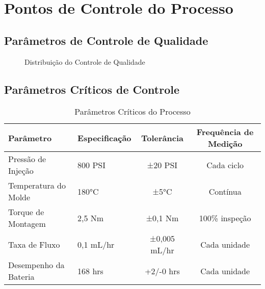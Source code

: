 \documentclass[12pt,a4paper]{report}
\begin{document}
\section{Pontos de Controle do Processo}

\subsection{Parâmetros de Controle de Qualidade}
\begin{figure}[H]
\centering
{}
\caption{Distribuição do Controle de Qualidade}
\label{fig:qc-distribution}
\end{figure}

\subsection{Parâmetros Críticos de Controle}
\begin{table}[H]
\centering
\caption{Parâmetros Críticos do Processo}
\label{tab:critical-parameters}
\begin{tabular}{@{}llcc@{}}
\toprule
Parâmetro & Especificação & Tolerância & Frequência de Medição \\
\midrule
Pressão de Injeção & 800 PSI & ±20 PSI & Cada ciclo \\
Temperatura do Molde & 180°C & ±5°C & Contínua \\
Torque de Montagem & 2,5 Nm & ±0,1 Nm & 100\% inspeção \\
Taxa de Fluxo & 0,1 mL/hr & ±0,005 mL/hr & Cada unidade \\
Desempenho da Bateria & 168 hrs & +2/-0 hrs & Cada unidade \\
\bottomrule
\end{tabular}
\end{table}
\end{document}
